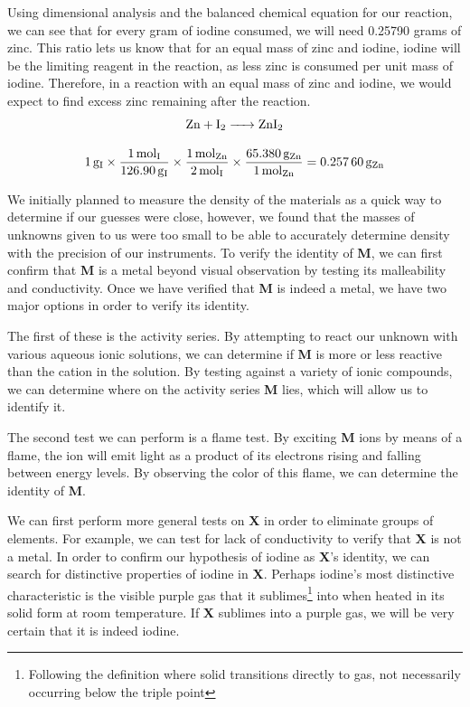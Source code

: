 \documentclass[titlepage]{article}
\begin{document}
Using dimensional analysis and the balanced chemical equation for our reaction, we can see that for every gram of iodine consumed, we will need 0.25790 grams of zinc. This ratio lets us know that for an equal mass of zinc and iodine, iodine will be the limiting reagent in the reaction, as less zinc is consumed per unit mass of iodine. Therefore, in a reaction with an equal mass of zinc and iodine, we would expect to find excess zinc remaining after the reaction.
\begin{gather*}
    \ce{Zn + I2 -> ZnI2} \\[2ex]
    \SI{1}{\gram\of{I}}\times\frac{\SI{1}{\mol\of{I}}}{\SI{126.90}{\gram\of{I}}}\times\frac{\SI{1}{\mol\of{Zn}}}{\SI{2}{\mol\of{I}}}\times\frac{\SI{65.380}{\gram\of{Zn}}}{\SI{1}{\mol\of{Zn}}}=\SI{0.25760}{\gram\of{Zn}}
\end{gather*}

We initially planned to measure the density of the materials as a quick way to determine if our guesses were close, however, we found that the masses of unknowns given to us were too small to be able to accurately determine density with the precision of our instruments. To verify the identity of \textbf{M}, we can first confirm that \textbf{M} is a metal beyond visual observation by testing its malleability and conductivity. Once we have verified that \textbf{M} is indeed a metal, we have two major options in order to verify its identity. 

The first of these is the activity series. By attempting to react our unknown with various aqueous ionic solutions, we can determine if \textbf{M} is more or less reactive than the cation in the solution. By testing against a variety of ionic compounds, we can determine where on the activity series \textbf{M} lies, which will allow us to identify it. 

The second test we can perform is a flame test. By exciting \textbf{M} ions by means of a flame, the ion will emit light as a product of its electrons rising and falling between energy levels. By observing the color of this flame, we can determine the identity of \textbf{M}.
\bigskip

We can first perform more general tests on \textbf{X} in order to eliminate groups of elements. For example, we can test for lack of conductivity to verify that \textbf{X} is not a metal. In order to confirm our hypothesis of iodine as \textbf{X}'s identity, we can search for distinctive properties of iodine in \textbf{X}. Perhaps iodine's most distinctive characteristic is the visible purple gas that it sublimes\footnote{Following the definition where solid transitions directly to gas, not necessarily occurring below the triple point} into when heated in its solid form at room temperature. If \textbf{X} sublimes into a purple gas, we will be very certain that it is indeed iodine.
\end{document}
